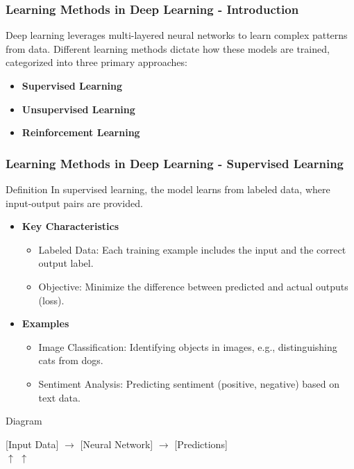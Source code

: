 \documentclass[aspectratio=169]{beamer}
\begin{document}
\begin{frame}[fragile]
    \frametitle{Learning Methods in Deep Learning - Introduction}
    Deep learning leverages multi-layered neural networks to learn complex patterns from data. Different learning methods dictate how these models are trained, categorized into three primary approaches: 
    \begin{itemize}
        \item \textbf{Supervised Learning}
        \item \textbf{Unsupervised Learning}
        \item \textbf{Reinforcement Learning}
    \end{itemize}
\end{frame}

\begin{frame}[fragile]
    \frametitle{Learning Methods in Deep Learning - Supervised Learning}
    \begin{block}{Definition}
        In supervised learning, the model learns from labeled data, where input-output pairs are provided.
    \end{block}
    
    \begin{itemize}
        \item \textbf{Key Characteristics}
        \begin{itemize}
            \item Labeled Data: Each training example includes the input and the correct output label.
            \item Objective: Minimize the difference between predicted and actual outputs (loss).
        \end{itemize}
        
        \item \textbf{Examples}
        \begin{itemize}
            \item Image Classification: Identifying objects in images, e.g., distinguishing cats from dogs.
            \item Sentiment Analysis: Predicting sentiment (positive, negative) based on text data.
        \end{itemize}
    \end{itemize}
    
    \begin{block}{Diagram}
        \begin{center}
            [Input Data] $\rightarrow$ [Neural Network] $\rightarrow$ [Predictions] \\
            \quad \quad $\uparrow$ \quad \quad \quad \quad \quad $\uparrow$ \\
            \quad {} \quad {}
        \end{center}
    \end{block}
\end{frame}
\end{document}
